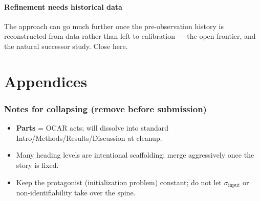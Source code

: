 \documentclass[11pt]{article}
\begin{document}
\subsection{Refinement needs historical data}
The approach can go much further once the pre-observation history is
reconstructed from data rather than left to calibration --- the open frontier,
and the natural successor study. Close here.

\part{Appendices}
\appendix


\section*{Notes for collapsing (remove before submission)}
\begin{itemize}
  \item \textbf{Parts} = OCAR acts; will dissolve into standard
        Intro/Methods/Results/Discussion at cleanup.
  \item Many heading levels are intentional scaffolding; merge aggressively
        once the story is fixed.
  \item Keep the protagonist (initialization problem) constant; do not let
        $\sigma_{\mathrm{input}}$ or non-identifiability take over the spine.
\end{itemize}
\end{document}
